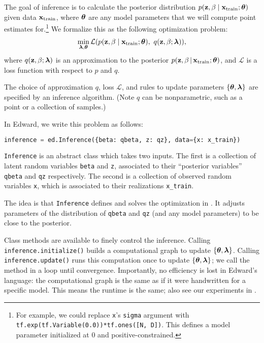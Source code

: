 The goal of inference is to
calculate the posterior distribution
$p(\mathbf{z}, \beta\mid \mathbf{x}_{\text{train}}; \boldsymbol{\mathbf{\theta}})$
given data $\boldsymbol{\mathbf{x}}_{\text{train}}$,
where
$\boldsymbol{\mathbf{\theta}}$ are any model parameters that we will compute point estimates
for.\footnote{%
For example, we could replace \texttt{x}'s \texttt{sigma}
argument with \texttt{tf.exp(tf.Variable(0.0))*tf.ones([N, D])}. This
defines a model parameter initialized at 0 and positive-constrained.}
We formalize this as the following optimization problem:
\begin{align}
  \label{eq:inference-optimization}
\min_{\boldsymbol{\mathbf{\lambda}},\boldsymbol{\mathbf{\theta}}}
\mathcal{L}(
p(\mathbf{z}, \beta\mid \mathbf{x}_{\text{train}}; \boldsymbol{\mathbf{\theta}}),~
q(\mathbf{z}, \beta; \boldsymbol{\mathbf{\lambda}})
),
\end{align}
where $q(\mathbf{z}, \beta; \boldsymbol{\mathbf{\lambda}})$ is an approximation to the
posterior $p(\mathbf{z}, \beta\,|\, \boldsymbol{\mathbf{x}}_{\text{train}};\boldsymbol{\mathbf{\theta}})$, and
$\mathcal{L}$ is a loss function with respect to $p$ and $q$.

The choice of approximation $q$, loss $\mathcal{L}$, and rules to update
parameters $\{\boldsymbol{\mathbf{\theta}},\boldsymbol{\mathbf{\lambda}}\}$ are specified by an inference algorithm.
(Note $q$ can be nonparametric, such as a point or a collection of
samples.)

In Edward, we write this problem as follows:

\begin{lstlisting}[language=python]
inference = ed.Inference({beta: qbeta, z: qz}, data={x: x_train})
\end{lstlisting}

\texttt{Inference} is an abstract class which takes two inputs.  The
first is a collection of latent random variables \texttt{beta} and
\texttt{z}, associated to their ``posterior variables'' \texttt{qbeta} and
\texttt{qz} respectively. The second is a collection of observed random variables
\texttt{x}, which is associated to their realizations \texttt{x_train}.

The idea is that \texttt{Inference} defines and
solves the optimization in . It
adjusts parameters of the distribution of \texttt{qbeta}
and \texttt{qz} (and any model parameters) to be close to the
posterior.

Class methods are available to finely control the inference. Calling
\texttt{inference.initialize()} builds a computational graph to update
$\{\boldsymbol{\mathbf{\theta}},\boldsymbol{\mathbf{\lambda}}\}$. Calling \texttt{inference.update()} runs
this computation once to update $\{\boldsymbol{\mathbf{\theta}},\boldsymbol{\mathbf{\lambda}}\}$; we call the
method in a loop until convergence. Importantly, no efficiency is lost
in Edward's language: the computational graph is the same as if it
were handwritten for a
specific model. This means the runtime is the same; also see our
experiments in .

